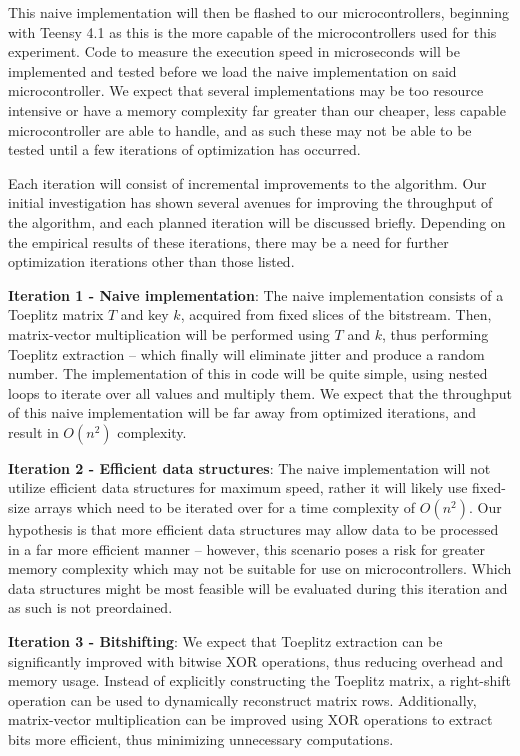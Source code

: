 This naive implementation will then be flashed to our microcontrollers, beginning with Teensy 4.1 as this is the more capable of the microcontrollers used for this experiment. Code to measure the execution speed in microseconds will be implemented and tested before we load the naive implementation on said microcontroller. We expect that several implementations may be too resource intensive or have a memory complexity far greater than our cheaper, less capable microcontroller are able to handle, and as such these may not be able to be tested until a few iterations of optimization has occurred.

Each iteration will consist of incremental improvements to the algorithm. Our initial investigation has shown several avenues for improving the throughput of the algorithm, and each planned iteration will be discussed briefly. Depending on the empirical results of these iterations, there may be a need for further optimization iterations other than those listed.

\textbf{Iteration 1 - Naive implementation}: The naive implementation consists of a Toeplitz matrix \(T\) and key \(k\), acquired from fixed slices of the bitstream. Then, matrix-vector multiplication will be performed using \(T\) and \(k\), thus performing Toeplitz extraction -- which finally will eliminate jitter and produce a random number. The implementation of this in code will be quite simple, using nested loops to iterate over all values and multiply them. We expect that the throughput of this naive implementation will be far away from optimized iterations, and result in \(O(n^2)\) complexity.

\textbf{Iteration 2 - Efficient data structures}: The naive implementation will not utilize efficient data structures for maximum speed, rather it will likely use fixed-size arrays which need to be iterated over for a time complexity of \(O(n^2)\). Our hypothesis is that more efficient data structures may allow data to be processed in a far more efficient manner -- however, this scenario poses a risk for greater memory complexity which may not be suitable for use on microcontrollers. Which data structures might be most feasible will be evaluated during this iteration and as such is not preordained.

\textbf{Iteration 3 - Bitshifting}: We expect that Toeplitz extraction can be significantly improved with bitwise XOR operations, thus reducing overhead and memory usage. Instead of explicitly constructing the Toeplitz matrix, a right-shift operation can be used to dynamically reconstruct matrix rows. Additionally, matrix-vector multiplication can be improved using XOR operations to extract bits more efficient, thus minimizing unnecessary computations.


